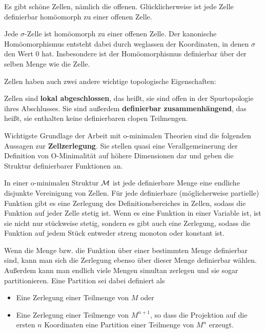 Es gibt \glqq{}schöne\grqq{} Zellen, nämlich die offenen. Glücklicherweise ist jede Zelle definierbar homöomorph zu einer offenen Zelle.
\begin{lemma}
	Jede $\sigma$-Zelle ist homöomorph zu einer offenen Zelle. Der kanonische Homöomorphismus entsteht dabei durch weglassen der Koordinaten, in denen $\sigma$ den Wert 0 hat. Insbesondere ist der Homöomorphismus definierbar über der selben Menge wie die Zelle.
\end{lemma}

Zellen haben auch zwei andere wichtige topologische Eigenschaften:
\begin{lemma}
	Zellen sind \textbf{lokal abgeschlossen}, das heißt, sie sind offen in der Spurtopologie ihres Abschlusses. Sie sind außerdem \textbf{definierbar zusammenhängend}, das heißt, sie enthalten keine definierbaren clopen Teilmengen.
\end{lemma}

Wichtigste Grundlage der Arbeit mit o-minimalen Theorien sind die folgenden Aussagen zur \textbf{Zellzerlegung}. Sie stellen quasi eine Verallgemeinerung der Definition von O-Minimalität auf höhere Dimensionen dar und geben die Struktur definierbarer Funktionen an.
\begin{theorem}
	In einer o-minimalen Struktur $\mathcal{M}$ ist jede definierbare Menge eine endliche disjunkte Vereinigung von Zellen. Für jede definierbare (möglicherweise partielle) Funktion gibt es eine Zerlegung des Definitionsbereiches in Zellen, sodass die Funktion auf jeder Zelle stetig ist. Wenn es eine Funktion in einer Variable ist, ist sie nicht nur stückweise stetig, sondern es gibt auch eine Zerlegung, sodass die Funktion auf jedem Stück entweder streng monoton oder konstant ist.
\end{theorem}
\begin{remark}
	Wenn die Menge bzw. die Funktion über einer bestimmten Menge definierbar sind, kann man sich die Zerlegung ebenso über dieser Menge definierbar wählen. Außerdem kann man endlich viele Mengen simultan zerlegen und sie sogar partitionieren. Eine Partition sei dabei definiert als
	\begin{itemize}
		\item Eine Zerlegung einer Teilmenge von $M$ oder
		\item Eine Zerlegung einer Teilmenge von $M^{n+1}$, so dass die Projektion auf die ersten $n$ Koordinaten eine Partition einer Teilmenge von $M^n$ erzeugt.
	\end{itemize}
\end{remark}

